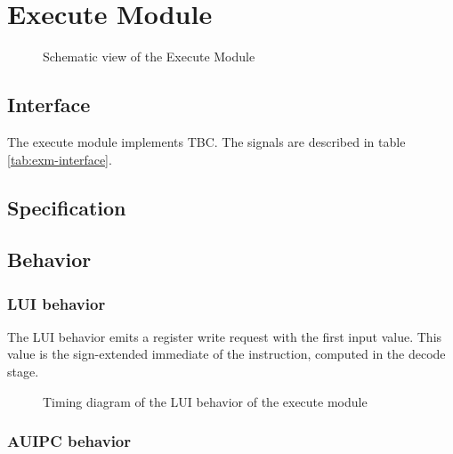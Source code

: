 \section{Execute Module}

\begin{figure}[h!]
    \centering
    
    \caption{Schematic view of the Execute Module}
    \label{fig:exm}
\end{figure}

\subsection{Interface}

\begin{content}
The execute module implements TBC. The signals are described in table \ref{tab:exm-interface}. 
\end{content}



\subsection{Specification}

\subsection{Behavior}

\subsubsection{LUI behavior}

\begin{content}
    The LUI behavior emits a register write request with the first input value. This value is the sign-extended immediate of the instruction, computed in the decode stage.
\end{content}

\begin{figure}[H]
    \centering
    
    \caption{Timing diagram of the LUI behavior of the execute module}
    \label{fig:exm-behavior-lui}
\end{figure}

\subsubsection{AUIPC behavior}

